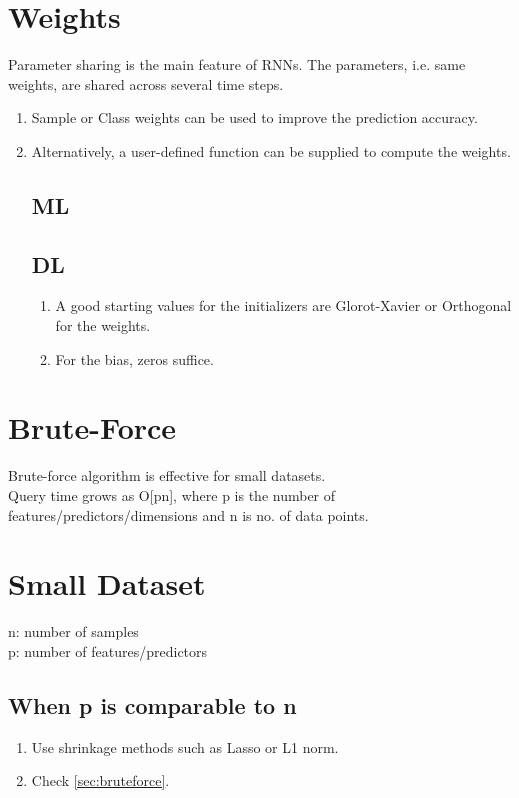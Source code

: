 \documentclass[a4paper, 12pt]{report}
\begin{document}
\section{Weights}
Parameter sharing is the main feature of RNNs. The parameters, i.e. same weights, are shared across several time steps.
\label{sec:weights}
\begin{enumerate}
\item Sample or Class weights can be used to improve the prediction accuracy.
\item Alternatively, a user-defined function can be supplied to compute the weights.

\subsection{ML}

\subsection{DL}
\begin{enumerate}
\item A good starting values for the initializers are Glorot-Xavier or Orthogonal for the weights.
\item For the bias, zeros suffice.
\end{enumerate}
\end{enumerate}



\section{Brute-Force}
\label{sec:bruteforce}

Brute-force algorithm is effective for small datasets.\\
Query time grows as O[pn], where p is the number of features/predictors/dimensions and n is no. of data points.

\section{Small Dataset}
\label{sec:smalldatasize}
n: number of samples\\
p: number of features/predictors

\subsection{When p is comparable to n}
\begin{enumerate}

\item Use shrinkage methods such as Lasso or L1 norm.
\item Check  \autoref{sec:bruteforce}.

\end{enumerate}
\end{document}
